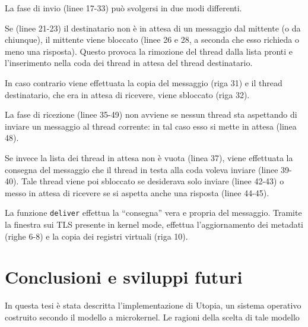 \documentclass[12pt,a4paper]{report}
\newcommand{\vir}[1]{``#1''}
\begin{document}
			La fase di invio (linee 17-33) può svolgersi in due modi differenti.
			
			Se (linee 21-23) il destinatario non è in attesa di un messaggio dal mittente (o da chiunque), il mittente
			viene bloccato (linee 26 e 28, a seconda che esso richieda o meno una risposta). Questo provoca la
			rimozione del thread dalla lista pronti e l'inserimento nella coda dei thread in attesa del thread destinatario.
			
			In caso contrario viene effettuata la copia del messaggio (riga 31) e il thread destinatario, che era in attesa
			di ricevere, viene sbloccato (riga 32).
			
			La fase di ricezione (linee 35-49) non avviene se nessun thread sta aspettando di inviare un messaggio al
			thread corrente: in tal caso esso si mette in attesa (linea 48).
			
			Se invece la lista dei thread in attesa non è vuota (linea 37), viene effettuata la consegna del messaggio
			che il thread in testa alla coda voleva inviare (linee 39-40). Tale thread viene poi sbloccato se desiderava
			solo inviare (linee 42-43) o messo in attesa di ricevere se si aspetta anche una risposta (linee 44-45).
			
			La funzione \texttt{deliver} effettua la \vir{consegna} vera e propria del messaggio. Tramite la finestra sui TLS
			presente in kernel mode, effettua l'aggiornamento dei metadati (righe 6-8) e la copia dei registri
			virtuali (riga 10).
					
\chapter{Conclusioni e sviluppi futuri}
	In questa tesi è stata descritta l'implementazione di Utopia, un sistema operativo costruito secondo il modello
	a microkernel. Le ragioni della scelta di tale modello 
	

\end{document}
